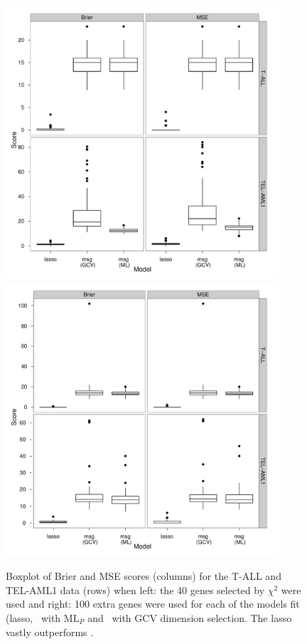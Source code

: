 \begin{figure}
\centering
\includegraphics[width=4in]{gds/figs/sim-msebrier.pdf} \includegraphics[width=4in]{gds/figs/confsim-msebrier.pdf} \\
\caption{Boxplot of Brier and MSE scores (columns) for the T-ALL and TEL-AML1 data (rows) when left: the 40 genes selected by $\chi^2$ were used and right: 100 extra genes were used for each of the models fit (lasso, \mdsds\ with $\text{ML}_P$ and \mdsds\ with GCV dimension selection. The lasso vastly outperforms \mdsds.}
\label{leuk-sim-boxplot}
\end{figure}

